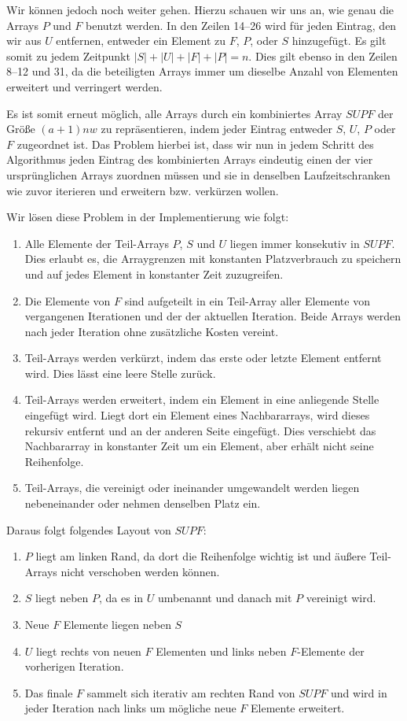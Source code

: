 Wir können jedoch noch weiter gehen. Hierzu schauen wir uns an, wie genau die Arrays $P$ und $F$ benutzt werden. In den Zeilen 14--26 wird für jeden Eintrag, den wir aus $U$ entfernen, entweder ein Element zu $F$, $P$, oder $S$ hinzugefügt. Es gilt somit zu jedem Zeitpunkt $|S| + |U| + |F| + |P| = n$. Dies gilt ebenso in den Zeilen 8--12 und 31, da die beteiligten Arrays immer um dieselbe Anzahl von Elementen erweitert und verringert werden.

Es ist somit erneut möglich, alle Arrays durch ein kombiniertes Array $SUPF$ der Größe $(a + 1)nw$ zu repräsentieren, indem jeder Eintrag entweder $S$, $U$, $P$ oder $F$ zugeordnet ist. Das Problem hierbei ist, dass wir nun in jedem Schritt des Algorithmus jeden Eintrag des kombinierten Arrays eindeutig einen der vier ursprünglichen Arrays zuordnen müssen und sie in denselben Laufzeitschranken wie zuvor iterieren und erweitern bzw. verkürzen wollen.

Wir lösen diese Problem in der Implementierung wie folgt:

\begin{enumerate}
\item Alle Elemente der Teil-Arrays $P$, $S$ und $U$ liegen immer konsekutiv in $SUPF$. Dies erlaubt es, die Arraygrenzen mit konstanten Platzverbrauch zu speichern und auf jedes Element in konstanter Zeit zuzugreifen.
\item Die Elemente von $F$ sind aufgeteilt in ein Teil-Array aller Elemente von vergangenen Iterationen und der der aktuellen Iteration. Beide Arrays werden nach jeder Iteration ohne zusätzliche Kosten vereint.
\item Teil-Arrays werden verkürzt, indem das erste oder letzte Element entfernt wird. Dies lässt eine leere Stelle zurück.
\item Teil-Arrays werden erweitert, indem ein Element in eine anliegende Stelle eingefügt wird. Liegt dort ein Element eines Nachbararrays, wird dieses rekursiv entfernt und an der anderen Seite eingefügt. Dies verschiebt das Nachbararray in konstanter Zeit um ein Element, aber erhält nicht seine Reihenfolge.
\item Teil-Arrays, die vereinigt oder ineinander umgewandelt werden liegen nebeneinander oder nehmen denselben Platz ein.
\end{enumerate}

Daraus folgt folgendes Layout von $SUPF$:

\begin{enumerate}
\item $P$ liegt am linken Rand, da dort die Reihenfolge wichtig ist und äußere Teil-Arrays nicht verschoben werden können.
\item $S$ liegt neben $P$, da es in $U$ umbenannt und danach mit $P$ vereinigt wird.
\item Neue $F$ Elemente liegen neben $S$
\item $U$ liegt rechts von neuen $F$ Elementen und links neben $F$-Elemente der vorherigen Iteration.
\item Das finale $F$ sammelt sich iterativ am rechten Rand von $SUPF$ und wird in jeder Iteration nach links um mögliche neue $F$ Elemente erweitert.
\end{enumerate}

